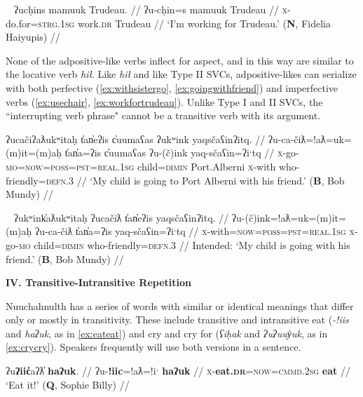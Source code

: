\ex~ \label{ex:workfortrudeau}
\begingl
\glpreamble ʔucḥins mamuuk Trudeau. //
\gla ʔu-cḥin=s mamuuk Trudeau //
\glb \textsc{x}-do.for=\textsc{strg.1sg} work.\textsc{dr} Trudeau //
\glft `I'm working for Trudeau.' (\textbf{N}, Fidelia Haiyupis) //
\endgl
\xe

None of the adpositive-like verbs inflect for aspect, and in this way are similar to the locative verb \textit{hił}. Like \textit{hił} and like Type II SVCs, adpositive-likes can serialize with both perfective (\ref{ex:withsistergo}, \ref{ex:goingwithfriend}) and imperfective verbs (\ref{ex:usechair}, \ref{ex:workfortrudeau}). Unlike Type I and II SVCs, the ``interrupting verb phrase" cannot be a transitive verb with its argument.

\ex \label{ex:goingwithfriend}
\begingl
\glpreamble ʔucačiʔaƛukʷitaḥ t̓an̓eʔis c̓uumaʕas ʔukʷink yaqsčaʕinʔitq. //
\gla ʔu-ca-čiƛ=!aƛ=uk=(m)it=(m)aḥ t̓an̓a=ʔis c̓uumaʕas ʔu-(č)ink yaq-sčaʕin=ʔiˑtq //
\glb \textsc{x}-go-\textsc{mo}=\textsc{now}=\textsc{poss}=\textsc{pst}=\textsc{real.1sg} child=\textsc{dimin} Port.Alberni \textsc{x}-with who-friendly=\textsc{defn.3} //
\glft `My child is going to Port Alberni with his friend.' (\textbf{B}, Bob Mundy) //
\endgl
\xe

\ex~ \label{ex:*goingwithfriend}
\begingl
\glpreamble *ʔukʷink̓aƛukʷitaḥ ʔucačiƛ t̓an̓eʔis yaqsčaʕinʔitq. //
\gla ʔu-(č)ink=!aƛ=uk=(m)it=(m)aḥ ʔu-ca-čiƛ t̓an̓a=ʔis yaq-sčaʕin=ʔiˑtq //
\glb \textsc{x}-with=\textsc{now}=\textsc{poss}=\textsc{pst}=\textsc{real.1sg} \textsc{x}-go-\textsc{mo} child=\textsc{dimin} who-friendly=\textsc{defn.3} //
\glft Intended: `My child is going with his friend.' (\textbf{B}, Bob Mundy) //
\endgl
\xe


\vspace{10pt}

\noindent \textbf{IV. Transitive-Intransitive Repetition}

\vspace{10pt}

Nuuchahnulth has a series of words with similar or identical meanings that differ only or mostly in transitivity. These include transitive and intransitive eat (\textit{-!iis} and \textit{haʔuk}, as in \ref{ex:eateat}) and cry and cry for (\textit{ʕiḥak} and \textit{ʔuʔuuy̓uk}, as in \ref{ex:crycry}). Speakers frequently will use both versions in a sentence.

\ex \label{ex:eateat}
\begingl
\glpreamble ʔu\textbf{ʔiic̓}aʔƛ̓ \textbf{haʔuk}. //
\gla ʔu-\textbf{!iic}=!aƛ=!iˑ \textbf{haʔuk} //
\glb \textsc{x}-\textbf{eat.\textsc{dr}}=\textsc{now}=\textsc{cmmd.2sg} \textbf{eat} //
\glft `Eat it!' (\textbf{Q}, Sophie Billy) //
\endgl
\xe

